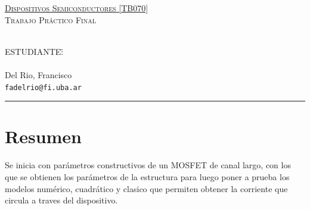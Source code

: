 \documentclass[a4paper, twoside, 10pt, spanish]{article}
\numberwithin{table}{section}
\begin{document}
%
\setcounter{page}{1}

%
%

\begin{center} %
{\underline{\textsc{Dispositivos Semiconductores [TB070]}}}\\
 {\textsc{Trabajo Práctico Final}}
\end{center}

 \begin{tabbing}
 \\
	ESTUDIANTE:\hspace{-1cm}\=\+\hspace{1cm}\=\hspace{6cm}\=\\	\>\>
              \\
              Del Rio, Francisco	\>\\ 
              \>\footnotesize{\verb!fadelrio@fi.uba.ar!}\\
           
 \end{tabbing}


\hrule
\vspace{0.2cm}



%

%

%
%

\DeclareSIUnit{}

\section{Resumen}

\quad Se inicia con parámetros constructivos de un MOSFET de canal largo, con los que se obtienen los parámetros de la estructura para luego poner a prueba los modelos numérico, cuadrático y clasico que permiten obtener la corriente que circula a traves del dispositivo. 
\end{document}
